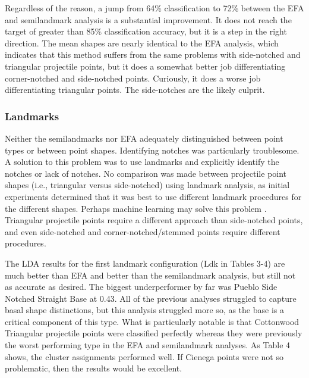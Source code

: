 \documentclass[a4paper]{article}
\begin{document}
Regardless of the reason, a jump from 64\% classification to 72\% between the EFA and semilandmark analysis is a substantial improvement. It does not reach the target of greater than 85\% classification accuracy, but it is a step in the right direction. The mean shapes are nearly identical to the EFA analysis, which indicates that this method suffers from the same problems with side-notched and triangular projectile points, but it does a somewhat better job differentiating corner-notched and side-notched points. Curiously, it does a worse job differentiating triangular points. The side-notches are the likely culprit.

\hypertarget{landmarks}{%
\subsubsection*{Landmarks}\label{landmarks}}

Neither the semilandmarks nor EFA adequately distinguished between point types or between point shapes. Identifying notches was particularly troublesome. A solution to this problem was to use landmarks and explicitly identify the notches or lack of notches. No comparison was made between projectile point shapes (i.e., triangular versus side-notched) using landmark analysis, as initial experiments determined that it was best to use different landmark procedures for the different shapes. Perhaps machine learning may solve this problem \autocites[see][]{Castillo_Flores2019-cs,MacLeod2018-aj,Nash2016-mc}. Triangular projectile points require a different approach than side-notched points, and even side-notched and corner-notched/stemmed points require different procedures.

The LDA results for the first landmark configuration (Ldk in Tables 3-4) are much better than EFA and better than the semilandmark analysis, but still not as accurate as desired. The biggest underperformer by far was Pueblo Side Notched Straight Base at 0.43. All of the previous analyses struggled to capture basal shape distinctions, but this analysis struggled more so, as the base is a critical component of this type. What is particularly notable is that Cottonwood Triangular projectile points were classified perfectly whereas they were previously the worst performing type in the EFA and semilandmark analyses. As Table 4 shows, the cluster assignments performed well. If Cienega points were not so problematic, then the results would be excellent.
\end{document}
